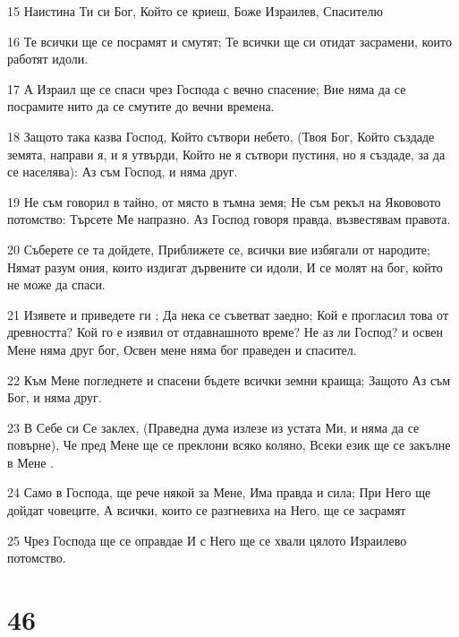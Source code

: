 \par 15 Наистина Ти си Бог, Който се криеш, Боже Израилев, Спасителю
\par 16 Те всички ще се посрамят и смутят; Те всички ще си отидат засрамени, които работят идоли.
\par 17 А Израил ще се спаси чрез Господа с вечно спасение; Вие няма да се посрамите нито да се смутите до вечни времена.
\par 18 Защото така казва Господ, Който сътвори небето, (Твоя Бог, Който създаде земята, направи я, и я утвърди, Който не я сътвори пустиня, но я създаде, за да се населява): Аз съм Господ, и няма друг.
\par 19 Не съм говорил в тайно, от място в тъмна земя; Не съм рекъл на Якововото потомство: Търсете Ме напразно. Аз Господ говоря правда, възвестявам правота.
\par 20 Съберете се та дойдете, Приближете се, всички вие избягали от народите; Нямат разум ония, които издигат дървените си идоли, И се молят на бог, който не може да спаси.
\par 21 Изявете и приведете ги ; Да нека се съветват заедно; Кой е прогласил това от древността? Кой го е изявил от отдавнашното време? Не аз ли Господ? и освен Мене няма друг бог, Освен мене няма бог праведен и спасител.
\par 22 Към Мене погледнете и спасени бъдете всички земни краища; Защото Аз съм Бог, и няма друг.
\par 23 В Себе си Се заклех, (Праведна дума излезе из устата Ми, и няма да се повърне), Че пред Мене ще се преклони всяко коляно, Всеки език ще се закълне в Мене .
\par 24 Само в Господа, ще рече някой за Мене, Има правда и сила; При Него ще дойдат човеците, А всички, които се разгневиха на Него, ще се засрамят
\par 25 Чрез Господа ще се оправдае И с Него ще се хвали цялото Израилево потомство.

\chapter{46}

